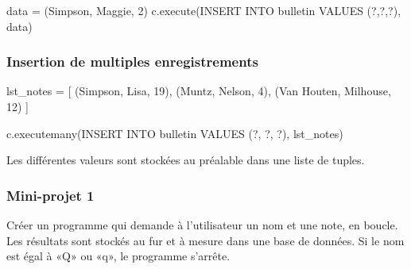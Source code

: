 \documentclass[
  letterpaper,
  DIV=11,
  numbers=noendperiod]{scrartcl}
\newenvironment{Shaded}{\begin{snugshade}}{\end{snugshade}}
\newcommand{\DecValTok}[1]{\textcolor[rgb]{0.68,0.00,0.00}{#1}}
\newcommand{\NormalTok}[1]{\textcolor[rgb]{0.00,0.23,0.31}{#1}}
\newcommand{\OperatorTok}[1]{\textcolor[rgb]{0.37,0.37,0.37}{#1}}
\newcommand{\StringTok}[1]{\textcolor[rgb]{0.13,0.47,0.30}{#1}}
\begin{document}
\begin{Shaded}
\begin{Highlighting}[]
\NormalTok{data }\OperatorTok{=}\NormalTok{ (}\StringTok{\textquotesingle{}Simpson\textquotesingle{}}\NormalTok{, }\StringTok{\textquotesingle{}Maggie\textquotesingle{}}\NormalTok{, }\DecValTok{2}\NormalTok{)}
\NormalTok{c.execute(}\StringTok{\textquotesingle{}\textquotesingle{}\textquotesingle{}INSERT INTO bulletin VALUES (?,?,?)\textquotesingle{}\textquotesingle{}\textquotesingle{}}\NormalTok{, data)}
\end{Highlighting}
\end{Shaded}

\hypertarget{insertion-de-multiples-enregistrements}{%
\subsubsection{Insertion de multiples
enregistrements}\label{insertion-de-multiples-enregistrements}}

\begin{Shaded}
\begin{Highlighting}[]
\NormalTok{lst\_notes }\OperatorTok{=}\NormalTok{ [ (}\StringTok{\textquotesingle{}Simpson\textquotesingle{}}\NormalTok{, }\StringTok{\textquotesingle{}Lisa\textquotesingle{}}\NormalTok{, }\DecValTok{19}\NormalTok{), (}\StringTok{\textquotesingle{}Muntz\textquotesingle{}}\NormalTok{, }\StringTok{\textquotesingle{}Nelson\textquotesingle{}}\NormalTok{, }\DecValTok{4}\NormalTok{), (}\StringTok{\textquotesingle{}Van Houten\textquotesingle{}}\NormalTok{, }\StringTok{\textquotesingle{}Milhouse\textquotesingle{}}\NormalTok{, }\DecValTok{12}\NormalTok{) ]}

\NormalTok{c.executemany(}\StringTok{\textquotesingle{}\textquotesingle{}\textquotesingle{}INSERT INTO bulletin VALUES (?, ?, ?)\textquotesingle{}\textquotesingle{}\textquotesingle{}}\NormalTok{, lst\_notes)}
\end{Highlighting}
\end{Shaded}

Les différentes valeurs sont stockées au préalable dans une liste de
tuples.

\hypertarget{mini-projet-1}{%
\subsubsection{Mini-projet 1}\label{mini-projet-1}}

Créer un programme qui demande à l'utilisateur un nom et une note, en
boucle. Les résultats sont stockés au fur et à mesure dans une base de
données. Si le nom est égal à «Q» ou «q», le programme s'arrête.
\end{document}
